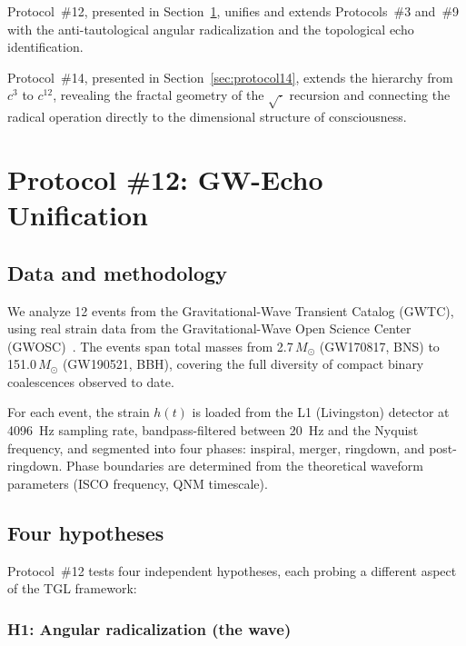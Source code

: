 \documentclass[12pt,a4paper,twocolumn]{article}
\begin{document}
Protocol~\#12, presented in Section~\ref{sec:protocol12}, unifies and extends Protocols~\#3 and~\#9 with the anti-tautological angular radicalization and the topological echo identification.

Protocol~\#14, presented in Section~\ref{sec:protocol14}, extends the hierarchy from $c^3$ to $c^{12}$, revealing the fractal geometry of the $\sqrt{\cdot}$ recursion and connecting the radical operation directly to the dimensional structure of consciousness.


\section{Protocol \#12: GW-Echo Unification}
\label{sec:protocol12}

\subsection{Data and methodology}

We analyze 12 events from the Gravitational-Wave Transient Catalog (GWTC), using real strain data from the Gravitational-Wave Open Science Center (GWOSC)~\cite{GWOSC2023}. The events span total masses from 2.7\,$M_\odot$ (GW170817, BNS) to 151.0\,$M_\odot$ (GW190521, BBH), covering the full diversity of compact binary coalescences observed to date.

For each event, the strain $h(t)$ is loaded from the L1 (Livingston) detector at 4096~Hz sampling rate, bandpass-filtered between 20~Hz and the Nyquist frequency, and segmented into four phases: inspiral, merger, ringdown, and post-ringdown. Phase boundaries are determined from the theoretical waveform parameters (ISCO frequency, QNM timescale).

\subsection{Four hypotheses}

Protocol~\#12 tests four independent hypotheses, each probing a different aspect of the TGL framework:

\subsubsection{H1: Angular radicalization (the wave)}
\end{document}
